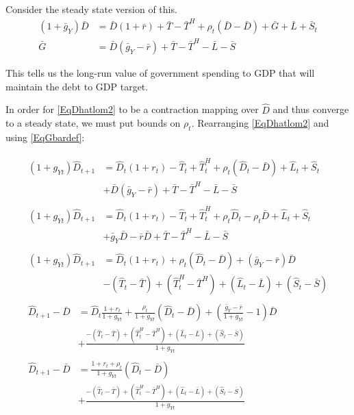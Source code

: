 \documentclass[letterpaper,11pt]{article}
\theoremstyle{definition}
\begin{document}
Consider the steady state version of this.
\begin{align}
	(1+\bar g_{Y}) \bar D & = \bar D(1+\bar r) + \bar T - \bar T^H + \rho_t (\bar D - \bar D) + \bar G + \bar L + \bar S_t  \nonumber \\
	\bar G & = \bar D(\bar g_{Y} -\bar r) + \bar T - \bar T^H - \bar L - \bar S  \label{EqGbardef}
\end{align}

This tells us the long-run value of government spending to GDP that will maintain the debt to GDP target.

In order for \eqref{EqDhatlom2} to be a contraction mapping over $\hat D$ and thus converge to a steady state, we must put bounds on $\rho_t$.  Rearranging \eqref{EqDhatlom2} and using \eqref{EqGbardef}:

\begin{align}
	\begin{split}
	(1+g_{Yt}) \hat D_{t+1} & = \hat D_t (1+r_t) - \hat T_t + \hat T^H_t + \rho_t (\hat D_t - \bar D) + \hat L_t + \hat S_t \\
	& + \bar D(\bar g_{Y} - \bar r) + \bar T - \bar T^H - \bar L - \bar S
	\end{split} \nonumber \\
	\begin{split}
	(1+g_{Yt}) \hat D_{t+1} & = \hat D_t (1+r_t) - \hat T_t + \hat T^H_t + \rho_t \hat D_t - \rho_t \bar D + \hat L_t + \hat S_t \\
	& + \bar g_Y \bar D - \bar r \bar D + \bar T - \bar T^H - \bar L - \bar S
	\end{split} \nonumber \\
	\begin{split}
	(1+g_{Yt}) \hat D_{t+1} & =  \hat D_t (1+r_t) + \rho_t (\hat D_t -\bar D) + (\bar g_Y - \bar r ) \bar D \\
	& - (\hat T_t - \bar T) + (\hat T^H_t -\bar T^H) + (\hat L_t -\bar L) + (\hat S_t -\bar S)
	\end{split} \nonumber \\
	\begin{split}
	\hat D_{t+1} - \bar D & = \hat D_t \frac{1+r_t}{1+g_{Yt}} + \frac{\rho_t}{1+g_{Yt}} (\hat D_t -\bar D) + \left( \frac{\bar g_Y - \bar r}{1+g_{Yt}} - 1 \right) \bar D \\
	& + \frac{-(\hat T_t - \bar T) + (\hat T^H_t -\bar T^H) + (\hat L_t -\bar L) + (\hat S_t -\bar S)}{1+g_{Yt}}
	\end{split}  \nonumber \\
	\begin{split} 
	\hat D_{t+1} - \bar D & = \frac{1+r_t+\rho_t}{1+g_{Yt}} (\hat D_t -\bar D) \\
	& + \frac{-(\hat T_t - \bar T) + (\hat T^H_t -\bar T^H) + (\hat L_t -\bar L) + (\hat S_t -\bar S)}{1+g_{Yt}}
	\end{split} 
	\label{EqStab}
\end{align}
\end{document}
